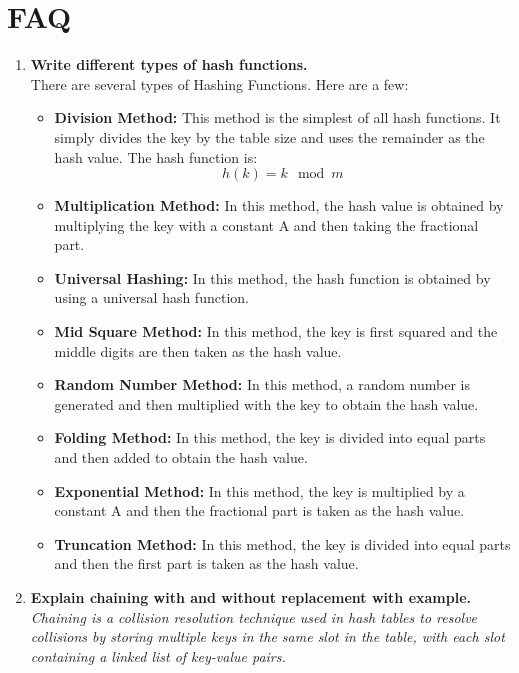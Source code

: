 \documentclass[11pt]{article}
\begin{document}
\section{FAQ}
\begin{enumerate}
    \item \textbf{Write different types of hash functions.}\\
          There are several types of Hashing Functions. Here are a few:
          \begin{itemize}
              \item \textbf{Division Method:} This method is the simplest of all hash functions. It simply divides the key by the table size and uses the remainder as the hash value. The hash function is: \[h(k) = k \mod m\]
              \item \textbf{Multiplication Method:} In this method, the hash value is obtained by multiplying the key with a constant A and then taking the fractional part.
              \item \textbf{Universal Hashing:} In this method, the hash function is obtained by using a universal hash function.
              \item \textbf{Mid Square Method:} In this method, the key is first squared and the middle digits are then taken as the hash value.
              \item \textbf{Random Number Method:} In this method, a random number is generated and then multiplied with the key to obtain the hash value.
              \item \textbf{Folding Method:} In this method, the key is divided into equal parts and then added to obtain the hash value.
              \item \textbf{Exponential Method:} In this method, the key is multiplied by a constant A and then the fractional part is taken as the hash value.
              \item \textbf{Truncation Method:} In this method, the key is divided into equal parts and then the first part is taken as the hash value.
          \end{itemize}

    \item \textbf{Explain chaining with and without replacement with example.}\\

          \textit{Chaining is a collision resolution technique used in hash tables to resolve collisions by storing multiple keys in the same slot in the table, with each slot containing a linked list of key-value pairs.}


\end{enumerate}
\end{document}
